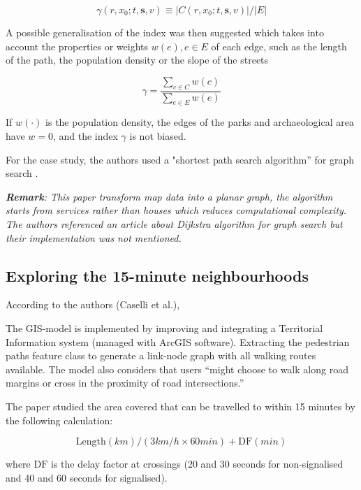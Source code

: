 $$ \gamma(r,x_0;t,\mathbf s,v)\equiv|C(r,x_0;t,\mathbf s,v)|/|E| $$

A possible generalisation of the index was then suggested which takes into account the properties or weights $w(e),e\in E$ of each edge, such as the length of the path, the population density or the slope of the streets

$$ \gamma=\frac{\sum_{c\in C}w(c)}{\sum_{e\in E}w(e)} $$

If $w(\cdot)$ is the population density, the edges of the parks and archaeological area have $w = 0$, and the index $\gamma$ is not biased.

For the case study, the authors used a "shortest path search algorithm” for graph search \cite{dijkstra_note_1959}.

\textit{\textbf{Remark}: This paper transform map data into a planar graph, the algorithm starts from services rather than houses which reduces computational complexity. The authors referenced an article about Dijkstra algorithm for graph search but their implementation was not mentioned.}

\subsection{Exploring the 15-minute neighbourhoods} \label{caselli_exploring_2022}

According to the authors (Caselli et al.),  \cite{caselli_exploring_2022}

The GIS-model is implemented by improving and integrating a Territorial Information system (managed with ArcGIS software). Extracting the pedestrian paths feature class to generate a link-node graph with all walking routes available. The model also considers that users “might choose to walk along road margins or cross in the proximity of road intersections.”

The paper studied the area covered that can be travelled to  within 15 minutes by the following calculation:

$$\text{Length}(km) / (3 km/h \times 60 min) + \text{DF} (min)$$

where $\text{DF}$ is the delay factor at crossings (20 and 30 seconds for non-signalised and 40 and 60 seconds for signalised).

